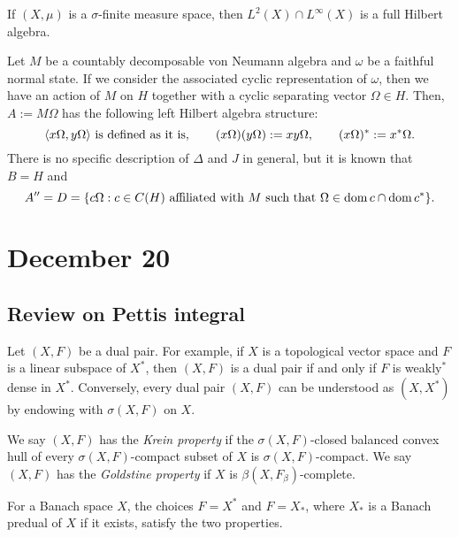 \documentclass{../../small}
\begin{document}
\begin{ex}
If $(X,\mu)$ is a $\sigma$-finite measure space, then $L^2(X)\cap L^\infty(X)$ is a full Hilbert algebra.
\end{ex}


\begin{ex}
Let $M$ be a countably decomposable von Neumann algebra and $\omega$ be a faithful normal state.
If we consider the associated cyclic representation of $\omega$, then we have an action of $M$ on $H$ together with a cyclic separating vector $\Omega\in H$.
Then, $A:=M\Omega$ has the following left Hilbert algebra structure:
\[\langle x\Omega,y\Omega\rangle\text{ is defined as it is},\qquad (x\Omega)(y\Omega):=xy\Omega,\qquad (x\Omega)^*:=x^*\Omega.\]
There is no specific description of $\Delta$ and $J$ in general, but it is known that $B=H$ and
\[A''=D=\{c\Omega:c\in C(H)\text{ affiliated with $M$ such that }\Omega\in\operatorname{dom} c\cap\operatorname{dom} c^*\}.\]
\end{ex}










\newpage
\section{December 20}

\subsection{Review on Pettis integral}

\begin{defn}
Let $(X,F)$ be a dual pair.
For example, if $X$ is a topological vector space and $F$ is a linear subspace of $X^*$, then $(X,F)$ is a dual pair if and only if $F$ is weakly$^*$ dense in $X^*$.
Conversely, every dual pair $(X,F)$ can be understood as $(X,X^*)$ by endowing with $\sigma(X,F)$ on $X$.

We say $(X,F)$ has the \emph{Krein property} if the $\sigma(X,F)$-closed balanced convex hull of every $\sigma(X,F)$-compact subset of $X$ is $\sigma(X,F)$-compact.
We say $(X,F)$ has the \emph{Goldstine property} if $X$ is $\beta(X,F_\beta)$-complete.
\end{defn}
\begin{rmk*}
For a Banach space $X$, the choices $F=X^*$ and $F=X_*$, where $X_*$ is a Banach predual of $X$ if it exists, satisfy the two properties.
\end{rmk*}
\end{document}
